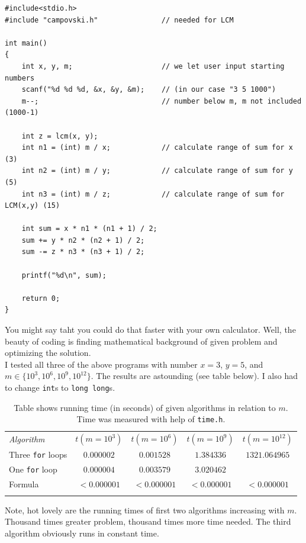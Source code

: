 \documentclass{book}
\begin{document}
\begin{verbatim}
#include<stdio.h>
#include "campovski.h"               // needed for LCM

int main()
{
    int x, y, m;                     // we let user input starting numbers
    scanf("%d %d %d, &x, &y, &m);    // (in our case "3 5 1000")
    m--;                             // number below m, m not included (1000-1)
    
    int z = lcm(x, y);
    int n1 = (int) m / x;            // calculate range of sum for x (3)
    int n2 = (int) m / y;            // calculate range of sum for y (5)
    int n3 = (int) m / z;            // calculate range of sum for LCM(x,y) (15)
    
    int sum = x * n1 * (n1 + 1) / 2;
    sum += y * n2 * (n2 + 1) / 2;
    sum -= z * n3 * (n3 + 1) / 2;
    
    printf("%d\n", sum);
    
    return 0; 
}
\end{verbatim}

You might say taht you could do that faster with your own calculator. Well, the beauty of coding is finding mathematical background of given problem and optimizing the solution.\\

I tested all three of the above programs with number $x = 3$, $y = 5$, and $m \in \{10^3, 10^6, 10^9, 10^{12}\}$. The results are astounding (see table below). I also had to change \texttt{int}s to \texttt{long long}s.

\begin{table}[h!]
\centering
\begin{tabular}{||l||c|c|c|c||}
\hhline{|t:=====:t|}
\textit{Algorithm} & $t(m = 10^3)$ & $t(m = 10^6)$ & $t(m=10^9)$ & $t(m=10^{12})$\\
\hhline{||=||=|=|=|=||}
Three \texttt{for} loops & $0.000002$ & $0.001528$ & $1.384336$ & $1321.064965$\\
\hhline{||-||-|-|-|-||}
One \texttt{for} loop & $0.000004$ & $0.003579$ & $3.020462$ & \\
\hhline{||-||-|-|-|-||}
Formula & $< 0.000001$ & $< 0.000001$ & $< 0.000001$ & $< 0.000001$\\
\hhline{|b:=====:b|}
\end{tabular}
\caption{Table shows running time (in seconds) of given algorithms in relation to $m$. Time was measured with help of \texttt{time.h}.}
\end{table}

Note, hot lovely are the running times of first two algorithms increasing with $m$. Thousand times greater problem, thousand times more time needed. The third algorithm obviously runs in constant time.
\end{document}

